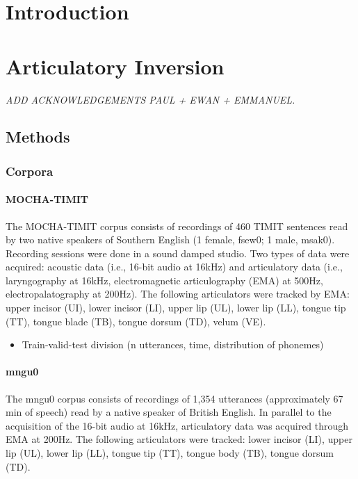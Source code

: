

\section{Introduction}







\section{Articulatory Inversion}
\small{\textit{{\color{red}ADD ACKNOWLEDGEMENTS PAUL + EWAN + EMMANUEL.\\}}}

\subsection{Methods}
\subsubsection{Corpora}
\paragraph{MOCHA-TIMIT}

The MOCHA-TIMIT corpus {\color{red}\cite{mocha}} consists of recordings of 460 TIMIT sentences read by two native speakers of Southern English (1 female, fsew0; 1 male, msak0). Recording sessions were done in a sound damped studio. Two types of data were acquired: acoustic data (i.e., 16-bit audio at 16kHz) and articulatory data (i.e., laryngography at 16kHz, electromagnetic articulography (EMA) at 500Hz, electropalatography at 200Hz). 
The following articulators were tracked by EMA: upper incisor (UI), lower incisor (LI), upper lip (UL), lower lip (LL), tongue tip (TT), tongue blade (TB), tongue dorsum (TD), velum (VE). 

\begin{itemize}
\item Train-valid-test division (n utterances, time, distribution of phonemes)
\end{itemize}

\paragraph{mngu0}
The mngu0 corpus {\color{red}\cite{richmond2011}} consists of recordings of 1,354 utterances (approximately 67 min of speech) read by a native speaker of British English. In parallel to the acquisition of the {\color{red}16-bit audio at 16kHz}, articulatory data was acquired through EMA at 200Hz.   
The following articulators were tracked: lower incisor (LI), upper lip (UL), lower lip (LL), tongue tip (TT), tongue body (TB), tongue dorsum (TD). 

